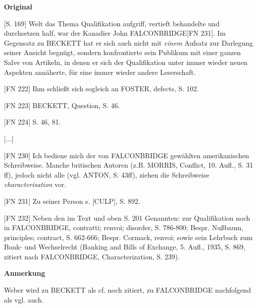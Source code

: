 \documentclass[ngerman,final,fontsize=12pt,paper=a4,twoside,bibliography=totocnumbered,BCOR=8mm,draft=false]{scrartcl}
\newenvironment{fragment}
	{\begin{snugshade}}
	{\end{snugshade}
	 \penalty-200
	 \vskip 0pt plus 10mm minus 5mm}
\newenvironment{fragmentpart}[1]
	{\noindent\textbf{#1}\par\penalty500}
	{\par}
\begin{document}
\begin{fragment}
\begin{fragmentpart}{Original \cite[S.~167--169 Z.~19--21,~1--4,~25--26,~1--6]{Weber-1986}}
{$[$S. 169$]$ 
Welt das Thema Qualifikation aufgriff, vertieft behandelte und durchsetzen half, war der Kanadier John FALCONBRIDGE$[$FN 231$]$. Im Gegensatz zu BECKETT hat er sich auch nicht mit \textsl{einem} Aufsatz zur Darlegung seiner Ansicht begnügt, sondern konfrontierte sein Publikum mit einer ganzen Salve von Artikeln, in denen er sich der Qualifikation unter immer wieder neuen Aspekten annäherte, für eine immer wieder andere Leserschaft.


$[$FN 222$]$ Ihm schließt sich sogleich an FOSTER, defects, S. 102.

$[$FN 223$]$ BECKETT, Question, S. 46. 

$[$FN 224$]$ S. 46, 81.

$[$...$]$

$[$FN 230$]$ Ich bediene mich der von FALCONBRIDGE gewählten amerikanischen Schreibweise. Manche britischen Autoren (z.B. MORRIS, Conflict, 10. Aufl., S. 31 ff), jedoch nicht alle (vgl. ANTON, S. 43ff), ziehen die Schreibweise \textsl{characterisation} vor.

$[$FN 231$]$ Zu seiner Person s. $[$CULP$]$, S. 892.

$[$FN 232$]$ Neben den im Text und oben S. 201 Genannten: zur Qualifikation noch in FALCONBRIDGE, contratti; renvoi; disorder, S. 786-800; Bespr. Nußbaum, principles; contract, S. 662-666; Bespr. Cormack, renvoi; sowie sein Lehrbuch zum Bank- und Wechselrecht (Banking and Bills of Exchange, 5. Aufl., 1935, S. 869, zitiert nach FALCONBRIDGE, Characterization, S. 239).}
\end{fragmentpart}
\begin{fragmentpart}{Anmerkung}
Weber wird zu BECKETT als \textquotedbl{}cf. noch\textquotedbl{} zitiert, zu FALCONBRIDGE nachfolgend als \textquotedbl{}vgl. auch\textquotedbl{}.
\end{fragmentpart}
\end{fragment}
\hypertarget{Lm-Fragment-028-04}{}
\end{document}
